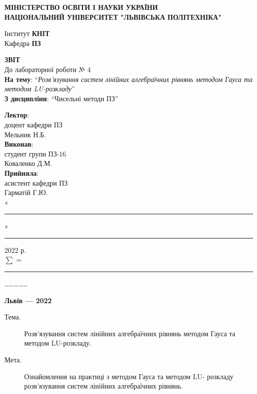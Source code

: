 \documentclass{article}
\newcommand\subject{Чисельні методи ПЗ}
\newcommand\lecturer{доцент кафедри ПЗ\\Мельник Н.Б.}
\newcommand\teacher{асистент кафедри ПЗ\\Гарматій Г.Ю.}
\newcommand\mygroup{ПЗ-16}
\newcommand\lab{4}
\newcommand\theme{Розв’язування систем лінійних алгебраїчних рівнянь методом Гауса та методом LU-розкладу}
\newcommand\purpose{Ознайомлення на практиці з методом Гауса та методом LU-
	розкладу розв’язування систем лінійних алгебраїчних рівнянь}
\begin{document}
	\begin{large}
		\begin{titlepage}
			\thispagestyle{empty}
			\begin{center}
				\textbf{МІНІСТЕРСТВО ОСВІТИ І НАУКИ УКРАЇНИ\\
					НАЦІОНАЛЬНИЙ УНІВЕРСИТЕТ "ЛЬВІВСЬКА ПОЛІТЕХНІКА"}
			\end{center}
			\begin{flushright}
				Інститут \textbf{КНІТ}\\
				Кафедра \textbf{ПЗ}
			\end{flushright}
			\vspace{200pt}
			\begin{center}
				\textbf{ЗВІТ}\\
				\vspace{10pt}
				До лабораторної роботи № \lab\\
				\textbf{На тему}: “\textit{\theme}”\\
				\textbf{З дисципліни}: “\subject”
			\end{center}
			\vspace{90pt}
			\begin{flushright}
				
				\textbf{Лектор}:\\
				\lecturer\\
				\vspace{28pt}
				\textbf{Виконав}:\\
				
				студент групи \mygroup\\
				Коваленко Д.М.\\
				\vspace{28pt}
				\textbf{Прийняла}:\\
				
				\teacher\\
				
				\vspace{28pt}
				«\rule{1cm}{0.15mm}» \rule{1.5cm}{0.15mm} 2022 р.\\
				$\sum$ = \rule{1cm}{0.15mm}……………\\
				
			\end{flushright}
			\vspace{\fill}
			\begin{center}
				\textbf{Львів — 2022}
			\end{center}
		\end{titlepage}
		
		\begin{description}
			\item[Тема.] \theme.
			\item[Мета.] \purpose.
		\end{description}
		

\end{large}
\end{document}
